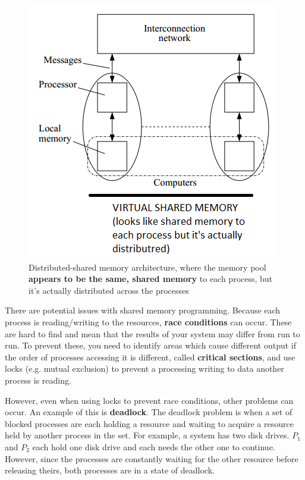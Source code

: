 \documentclass{article}
\begin{document}
\begin{figure}
	\centering
	\includegraphics[scale=0.7]{figures/distributed-shared-memory.png}
	\caption{Distributed-shared memory architecture, where the memory pool \textbf{appears to be the same, shared memory} to each process, but it's actually distributed across the processes}
	\label{fig:multi-process-hybrid-memory}
\end{figure}

There are potential issues with shared memory programming. Because each process is reading/writing to the resources, \textbf{race conditions} can occur. These are hard to find and mean that the results of your system may differ from run to run. To prevent these, you need to identify areas which cause different output if the order of processes accessing it is different, called \textbf{critical sections}, and use locks (e.g. mutual exclusion) to prevent a processing writing to data another process is reading.

However, even when using locks to prevent race conditions, other problems can occur. An example of this is \textbf{deadlock}. The deadlock problem is when a set of blocked processes are each holding a resource and waiting to acquire a resource held by another process in the set. For example, a system has two disk drives. $P_1$ and $P_2$ each hold one disk drive and each needs the other one to continue. However, since the processes are constantly waiting for the other resource before releasing theirs, both processes are in a state of deadlock.
\end{document}
